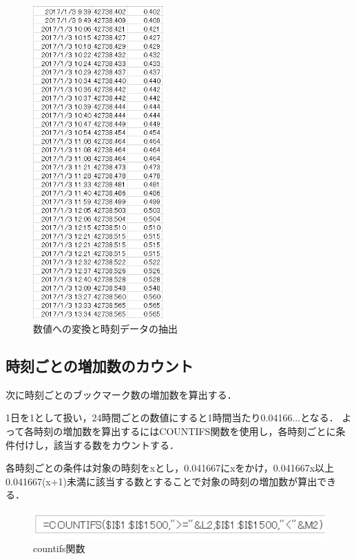 \begin{figure}[htb]
\centering
\includegraphics[width=5cm]{excel6.PNG}
\caption{数値への変換と時刻データの抽出}\label{excel6}
\end{figure}

\newpage

\subsection{時刻ごとの増加数のカウント}
次に時刻ごとのブックマーク数の増加数を算出する．\par
1日を1として扱い，24時間ごとの数値にすると1時間当たり0.04166...となる．
よって各時刻の増加数を算出するにはCOUNTIFS関数を使用し，各時刻ごとに条件付けし，該当する数をカウントする．\par
各時刻ごとの条件は対象の時刻をxとし，0.041667にxをかけ，0.041667x以上0.041667(x+1)未満に該当する数とすることで対象の時刻の増加数が算出できる．\par

\begin{figure}[htb]
\centering
\includegraphics[width=13cm]{countifs.PNG}
\caption{countifs関数}\label{count}
\end{figure}

\newpage

